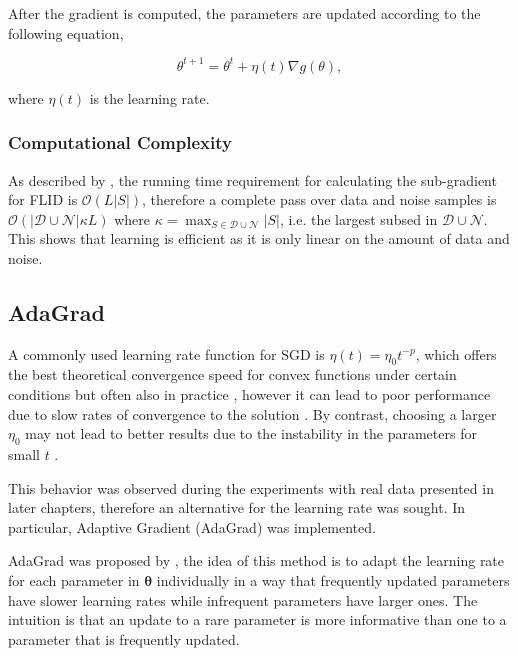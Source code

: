 After the gradient is computed, the parameters are updated according to the following equation,

\begin{equation}
  \theta^{t+1} = \theta^{t} + \eta(t) \nabla g(\theta),
\end{equation}

where $\eta(t)$ is the learning rate.

\subsubsection{Computational Complexity}

As described by \citet{tschiatschek16learning}, the running time requirement for calculating the sub-gradient for FLID is $\mathcal{O}(L|S|)$, therefore a complete pass over data and noise samples is $\mathcal{O}(|\mathcal{D}\cup\mathcal{N}|\kappa L)$ where $\kappa = \max_{S \in \mathcal{D}\cup\mathcal{N}}{|S|}$, i.e. the largest subsed in $\mathcal{D} \cup \mathcal{N}$. This shows that learning is efficient as it is only linear on the amount of data and noise.

\subsection{AdaGrad}
\label{sec:adagrad}

A commonly used learning rate function for SGD is $\eta(t) = \eta_{0}t^{-p}$, which offers the best theoretical convergence speed for convex functions under certain conditions but often also in practice \citep{bottou2012stochastic}, however it can lead to poor performance due to slow rates of convergence to the solution \citep{darken1992towards}. By contrast, choosing a larger $\eta_{0}$ may not lead to better results due to the instability in the parameters for small $t$ \citep{Darken1990}. 

This behavior was observed during the experiments with real data presented in later chapters, therefore an alternative for the learning rate was sought. In particular, Adaptive Gradient (AdaGrad) was implemented.

AdaGrad was proposed by \citet{Duchi2011adagrad}, the idea of this method is to adapt the learning rate for each parameter in $\boldsymbol{\theta}$ individually in a way that frequently updated parameters have slower learning rates while infrequent parameters have larger ones. The intuition is that an update to a rare parameter is more informative than one to a parameter that is frequently updated.

